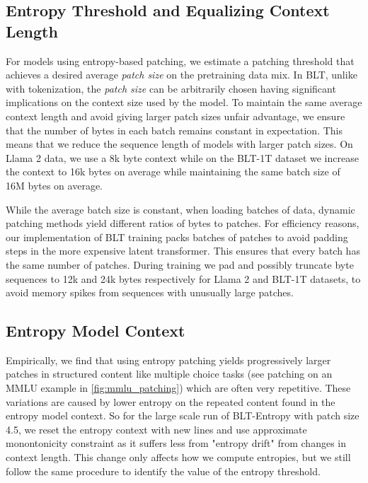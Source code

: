 \subsection{Entropy Threshold and Equalizing Context Length} For models using entropy-based patching, we estimate a patching threshold that achieves a desired average \textit{patch size} on the pretraining data mix.  In {\textsc BLT}, unlike with tokenization, the \textit{patch size} can be arbitrarily chosen having significant implications on the context size used by the model. To maintain the same average context length and avoid giving larger patch sizes unfair advantage, we ensure that the number of bytes in each batch remains constant in expectation. This means that we reduce the sequence length of models with larger patch sizes. On Llama 2 data, we use a 8k byte context while on the {\textsc BLT}-1T dataset we increase the context to 16k bytes on average while maintaining the same batch size of 16M bytes on average.

While the average batch size is constant, when loading batches of data, dynamic patching methods yield different ratios of bytes to patches. For efficiency reasons, our implementation of {\textsc BLT} training packs batches of patches to avoid padding steps in the more expensive latent transformer. This ensures that every batch has the same number of patches. During training we pad and possibly truncate byte sequences to 12k and 24k bytes respectively for Llama 2 and {\textsc BLT}-1T datasets, to avoid memory spikes from sequences with unusually large patches.

\subsection{Entropy Model Context}
\label{section:entropy-context}
Empirically, we find that using entropy patching yields progressively larger patches in structured content like multiple choice tasks (see patching on an MMLU example in \autoref{fig:mmlu_patching}) which are often very repetitive. These variations are caused by lower entropy on the repeated content found in the entropy model context. So for the large scale run of {\textsc BLT}-Entropy with patch size 4.5, we reset the entropy context with new lines and use approximate monontonicity constraint as it suffers less from "entropy drift" from changes in context length. This change only affects how we compute entropies, but we still follow the same procedure to identify the value of the entropy threshold.

